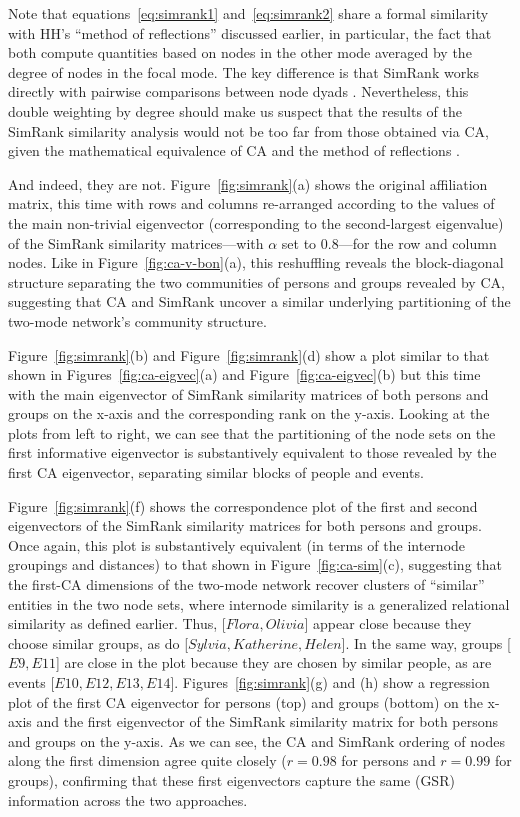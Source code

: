 \documentclass[a4paper,fleqn]{cas-sc}
\begin{document}
Note that equations~\ref{eq:simrank1} and~\ref{eq:simrank2} share a formal similarity with HH's ``method of reflections'' discussed earlier, in particular, the fact that both compute quantities based on nodes in the other mode averaged by the degree of nodes in the focal mode. The key difference is that SimRank works directly with pairwise comparisons between node dyads \citep{jeh2002simrank}. Nevertheless, this double weighting by degree should make us suspect that the results of the SimRank similarity analysis would not be too far from those obtained via CA, given the mathematical equivalence of CA and the method of reflections \citep{mealy2019interpreting, van2021correspondence}.

And indeed, they are not. Figure~\ref{fig:simrank}(a) shows the original affiliation matrix, this time with rows and columns re-arranged according to the values of the main non-trivial eigenvector (corresponding to the second-largest eigenvalue) of the SimRank similarity matrices---with $\alpha$ set to $0.8$---for the row and column nodes. Like in Figure~\ref{fig:ca-v-bon}(a), this reshuffling reveals the block-diagonal structure separating the two communities of persons and groups revealed by CA, suggesting that CA and SimRank uncover a similar underlying partitioning of the two-mode network's community structure. 

Figure~\ref{fig:simrank}(b) and Figure~\ref{fig:simrank}(d) show a plot similar to that shown in Figures~\ref{fig:ca-eigvec}(a) and Figure~\ref{fig:ca-eigvec}(b) but this time with the main eigenvector of SimRank similarity matrices of both persons and groups on the x-axis and the corresponding rank on the y-axis. Looking at the plots from left to right, we can see that the partitioning of the node sets on the first informative eigenvector is substantively equivalent to those revealed by the first CA eigenvector, separating similar blocks of people and events.  

Figure~\ref{fig:simrank}(f) shows the correspondence plot of the first and second eigenvectors of the SimRank similarity matrices for both persons and groups. Once again, this plot is substantively equivalent (in terms of the internode groupings and distances) to that shown in Figure~\ref{fig:ca-sim}(c), suggesting that the first-CA dimensions of the two-mode network recover clusters of ``similar'' entities in the two node sets, where internode similarity is a generalized relational similarity as defined earlier. Thus, [$Flora, Olivia$] appear close because they choose similar groups, as do [$Sylvia, Katherine, Helen$]. In the same way, groups [$E9, E11$] are close in the plot because they are chosen by similar people, as are events [$E10, E12, E13, E14$]. Figures~\ref{fig:simrank}(g) and (h) show a regression plot of the first CA eigenvector for persons (top) and groups (bottom) on the x-axis and the first eigenvector of the SimRank similarity matrix for both persons and groups on the y-axis. As we can see, the CA and SimRank ordering of nodes along the first dimension agree quite closely ($r = 0.98$ for persons and $r = 0.99$ for groups), confirming that these first eigenvectors capture the same (GSR) information across the two approaches. 
\end{document}
